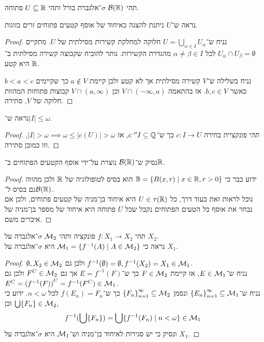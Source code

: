 \question{}
תהי $\mathcal{B}(\mathbb{R})$ $\sigma$־אלגברת בורל ותהי $U \subseteq \mathbb{R}$ פתוחה.

\subquestion{}
נראה ש־$U$ ניתנת להצגה כאיחוד של אוסף קטעים פתוחים זרים בזוגות.
\begin{proof}
	נניח ש־$U = \bigcup_{\alpha \in I} U_{\alpha}$ חלוקה למחלקת קשירות מסילתית של $U$.
	מתקיים $U_{\alpha} \cap U_{\beta} = \emptyset$ לכל $\alpha \ne \beta \in I$ מהגדרת הקשירות.
	נותר להוכיח שקבוצה קשירה מסילתית ב־$\mathbb{R}$ היא קטע.

	נניח בשלילה ש־$V$ קשירה מסילתית אך לא קטע ולכן קיימת $a \notin V$ כך שקיימים $b < a < c$ כאשר $b, c \in V$.
	אז בהתאמה $V \cap (-\infty, a)$ וכן $V \cap (a, \infty)$ קבוצות פתוחות המהוות חלוקה של $V$, סתירה.
\end{proof}

\subquestion{}
נראה ש־$|I| \le \omega$.
\begin{proof}
	תהי פונקציית בחירה $c : I \to U$ כך ש־$c\ '' I \subseteq \mathbb{Q}$, אז $|I| > \omega \implies \omega \le |c(U)| > \omega$, וזו כמובן סתירה.
\end{proof}

\subquestion{}
נסיק ש־$\mathcal{B}(\mathbb{R})$ נוצרת על־ידי אוסף הקטעים הפתוחים ב־$\mathbb{R}$.
\begin{proof}
	ידוע כבר כי $\mathbb{B} = \{ B(x, r) \mid x \in \mathbb{R}, r > 0 \}$ הוא בסיס לטופולוגיה של $\mathbb{R}$ ולכן מהווה גם בסיס ל־$\mathcal{B}(\mathbb{R})$. \\
	נוכל לראות זאת בעוד דרך, כל $U \in \tau(\mathbb{R})$ היא איחוד בן־מניה של קטעים פתוחים, ולכן אם נבחר את אוסף כל הטעים הפתוחים נקבל שכל $U$ פתוחה היא איחוד של מספר בן־מניה של איברים משם.
\end{proof}

\question{}
תהי $f : X_1 \to X_2$ פונקציה ותהי $\mathcal{M}_2$ $\sigma$־אלגברה על $X_2$.\\
נראה כי $\mathcal{M}_1 = \{ f^{-1}(A) \mid A \in \mathcal{M}_2 \}$ היא $\sigma$־אלגברה על $X_1$.
\begin{proof}
	$\emptyset, X_2 \in \mathcal{M}_2$ ולכן גם $f^{-1}(\emptyset) = \emptyset, f^{-1}(X_2) = X_1 \in \mathcal{M}_1$. \\
	נניח ש־$E \in \mathcal{M}_1$, אז קיימת $F \in \mathcal{M}_2$ כך ש־$E = f^{-1}(F)$ אך גם $F^C \in \mathcal{M}_2$ ולכן גם $E^C = {(f^{-1}(F))}^C = f^{-1}(F^C) \in \mathcal{M}_1$. \\
	נניח ש־${\{ E_n \}}_{n = 1}^{\infty} \subseteq \mathcal{M}_1$ ונסמן ${\{ F_n \}}_{n = 1}^{\infty} \subseteq \mathcal{M}_2$ כך ש־$f(E_n) = F_n$ לכל $n < \omega$.
	ידוע כי $\bigcup \{ F_n \} \in \mathcal{M}_2$ וכן,
	\[
		f^{-1}(\bigcup \{ F_n \})
		= \bigcup \{ f^{-1}(F_n) \mid n < \omega \}
		\in \mathcal{M}_1
	\]
	ונסיק כי יש סגירות לאיחוד בן־מניה וש־$\mathcal{M}_1$ היא $\sigma$־אלגברה על $X_1$.
\end{proof}


